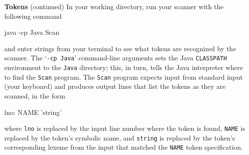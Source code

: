 \begin{minipage}[t]{\sw}
\slidenumber
\LARGE
{\bf Tokens} (continued)\exx
In your working directory, run your scanner
with the following command
{\Large
\begin{qv}
java -cp Java Scan
\end{qv}
}
and enter strings from your terminal
to see what tokens are recognized by the scanner.
The `\verb'-cp Java'' command-line arguments
sets the Java \verb'CLASSPATH' environment to the \verb'Java' directory;
this, in turn, tells the Java interpreter
where to find the \verb'Scan' program.\exx
The \verb'Scan' program expects input from standard input
(your keyboard)
and produces output lines that list the tokens as they are scanned,
in the form
\begin{qv}
lno: NAME 'string'
\end{qv}
where \verb'lno' is replaced
by the input line number where the token is found,
\verb'NAME' is replaced by the token's symbolic name,
and \verb'string' is replaced by the token's corresponding lexeme
from the input that matched the \verb'NAME' token specification.
\end{minipage}
\clearpage
